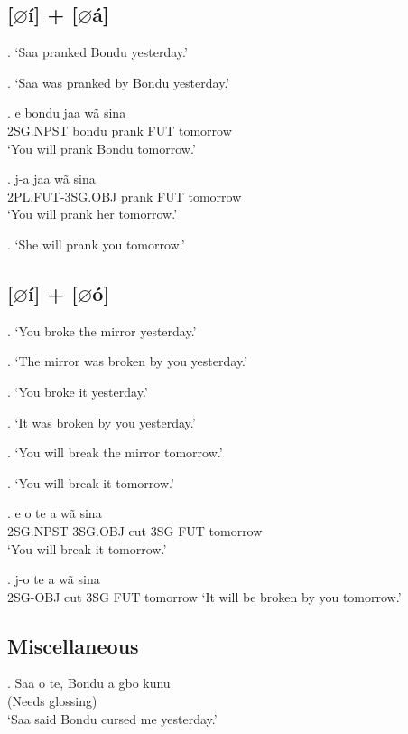 \documentclass{assets/fieldnotes}
\begin{document}
\subsection{[$\varnothing$í] + [$\varnothing$á]}

\ex. `Saa pranked Bondu yesterday.'

\ex. `Saa was pranked by Bondu yesterday.'


\exg. e bondu jaa wã sina \\
2SG.NPST bondu prank FUT tomorrow \\
`You will prank Bondu tomorrow.'

\ex. j-a jaa wã sina \\
2PL.FUT-3SG.OBJ prank FUT tomorrow \\
`You will prank her tomorrow.'


\ex. `She will prank you tomorrow.'



\subsection{[$\varnothing$í] + [$\varnothing$ó]}

\ex. `You broke the mirror yesterday.'

\ex. `The mirror was broken by you yesterday.'

\ex. `You broke it yesterday.'

\ex. `It was broken by you yesterday.'

\ex. `You will break the mirror tomorrow.'

\ex. `You will break it tomorrow.'

\exg. e o te a wã sina \\
2SG.NPST 3SG.OBJ cut 3SG FUT tomorrow \\
`You will break it tomorrow.'

\ex. j-o te a wã sina \\
2SG-OBJ cut 3SG FUT tomorrow
`It will be broken by you tomorrow.'

\subsection{Miscellaneous}


\exg. Saa o te, Bondu a gbo kunu\\
(Needs glossing)\\
`Saa said Bondu cursed me yesterday.'
\end{document}
